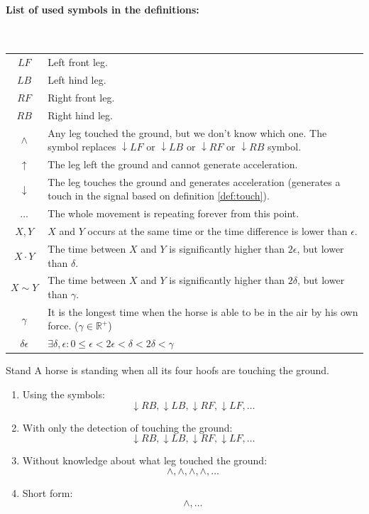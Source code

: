 \paragraph{List of used symbols in the definitions:}\quad\\
\begin{tabular}{c|p{.9\linewidth}}
	$LF$                   & Left front leg. \\
	$LB$                   & Left hind leg. \\
	$RF$                   & Right front leg. \\
	$RB$                   & Right hind leg. \\
	$\wedge$               & Any leg touched the ground, but we don't know which one. The symbol replaces $\downarrow LF$ or $\downarrow LB$ or $\downarrow RF$ or $\downarrow RB$ symbol. \\
	$\uparrow$             & The leg left the ground and cannot generate acceleration. \\
	$\downarrow$           & The leg touches the ground and generates acceleration (generates a touch in the signal based on definition \ref{def:touch}). \\
	$\dots$                & The whole movement is repeating forever from this point. \\
	$X, Y$                 & $X$ and $Y$ occurs at the same time or the time difference is lower than $\epsilon$. \\
	$X \cdot Y$            & The time between $X$ and $Y$ is significantly higher than $2\epsilon$, but lower than $\delta$. \\
	$X \sim Y$             & The time between $X$ and $Y$ is significantly higher than $2\delta$, but lower than $\gamma$. \\
	$\gamma$                & It is the longest time when the horse is able to be in the air by his own force. ($\gamma \in \mathbb{R^{+}}$) \\
	$\delta\epsilon$ & $ \exists \delta, \epsilon : 0 \leq \epsilon < 2\epsilon < \delta < 2\delta < \gamma $ \\
\end{tabular}

\begin{definition}{Stand}
	\label{def:stand}
	A horse is standing when all its four hoofs are touching the ground. \cite{Harrisc1993}
	
	\begin{enumerate}
		\item Using the symbols:
		$$ \downarrow RB, \downarrow LB, \downarrow RF, \downarrow LF, \dots $$
		\item With only the detection of touching the ground:
		$$ \downarrow RB, \downarrow LB, \downarrow RF, \downarrow LF, \dots $$
		\item Without knowledge about what leg touched the ground:
		$$ \wedge, \wedge, \wedge, \wedge, \dots $$
		\item Short form:
		$$ \wedge, \dots $$
	\end{enumerate}
\end{definition}

